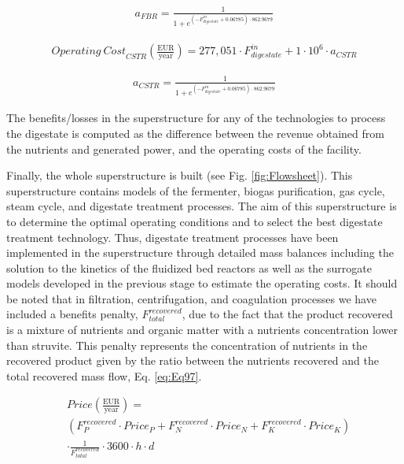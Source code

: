 \begin{refsection}[referencesCh2]
\begin{align}
	{a}_{FBR} = \frac{1}{1 + {e^{\left( { - F_{digestate}^{in} + 0.06785} \right) \cdot 862.9679}}} \label{eq:Eq94}
\end{align}

\begin{align}
	{Operating \ Cost}_{CSTR} \left( \frac{\text{EUR}}{\text{year}} \right) = 277,051 \cdot F_{digestate}^{in} +  1 \cdot {10^6} \cdot {a}_{CSTR} \label{eq:Eq95}
\end{align}

\begin{align}
	{a}_{CSTR} = \frac{1}{1 + {e^{\left( { - F_{digestate}^{in} + 0.06785} \right) \cdot 862.9679}}} \label{eq:Eq96}
\end{align}

The benefits/losses in the superstructure for any of the technologies to process the digestate is computed as the difference between the revenue obtained from the nutrients and generated power, and the operating costs of the facility.

Finally, the whole superstructure is built (see Fig. \ref{fig:Flowsheet}). This superstructure contains models of the fermenter, biogas purification, gas cycle, steam cycle, and digestate treatment processes. The aim of this superstructure is to determine the optimal operating conditions and to select the best digestate treatment technology. Thus, digestate treatment processes have been implemented in the superstructure through detailed mass balances including the solution to the kinetics of the fluidized bed reactors as well as the surrogate models developed in the previous stage to estimate the operating costs. It should be noted that in filtration, centrifugation, and coagulation processes we have included a benefits penalty, $F^{recovered}_{total}$, due to the fact that the product recovered is a mixture of nutrients and organic matter with a nutrients concentration lower than struvite. This penalty represents the concentration of nutrients in the recovered product given by the ratio between the nutrients recovered and the total recovered mass flow, Eq. \ref{eq:Eq97}.

\begin{align}
	& {Price} \left( \frac{\text{EUR}}{\text{year}} \right) = \label{eq:Eq97} \\ 
	& \left( {F_P^{recovered}\cdot{Price}_P} + F_N^{recovered} \cdot {Price}_N + F_{K}^{recovered} \cdot {Price}_K \right) \nonumber\\
	& \cdot \frac{1}{F_{total}^{recovered}} \cdot 3600 \cdot h\cdot d \nonumber
\end{align}


\end{refsection}
